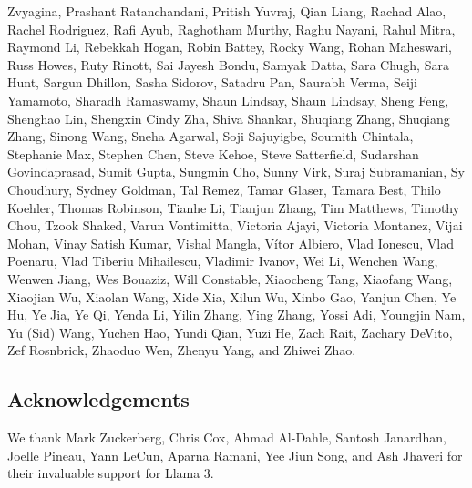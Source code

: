 Zvyagina, Prashant Ratanchandani, Pritish Yuvraj, Qian Liang, Rachad Alao, Rachel Rodriguez, Rafi Ayub, Raghotham Murthy, Raghu Nayani, Rahul Mitra, Raymond Li, Rebekkah Hogan, Robin Battey, Rocky Wang, Rohan Maheswari, Russ Howes, Ruty Rinott, Sai Jayesh Bondu, Samyak Datta, Sara Chugh, Sara Hunt, Sargun Dhillon, Sasha Sidorov, Satadru Pan, Saurabh Verma, Seiji Yamamoto, Sharadh Ramaswamy, Shaun Lindsay, Shaun Lindsay, Sheng Feng, Shenghao Lin, Shengxin Cindy Zha, Shiva Shankar, Shuqiang Zhang, Shuqiang Zhang, Sinong Wang, Sneha Agarwal, Soji Sajuyigbe, Soumith Chintala, Stephanie Max, Stephen Chen, Steve Kehoe, Steve Satterfield, Sudarshan Govindaprasad, Sumit Gupta, Sungmin Cho, Sunny Virk, Suraj Subramanian, Sy Choudhury, Sydney Goldman, Tal Remez, Tamar Glaser, Tamara Best, Thilo Koehler, Thomas Robinson, Tianhe Li, Tianjun Zhang, Tim Matthews, Timothy Chou, Tzook Shaked, Varun Vontimitta, Victoria Ajayi, Victoria Montanez, Vijai Mohan, Vinay Satish Kumar, Vishal Mangla, Vítor Albiero, Vlad Ionescu, Vlad Poenaru, Vlad Tiberiu Mihailescu, Vladimir Ivanov, Wei Li, Wenchen Wang, Wenwen Jiang, Wes Bouaziz, Will Constable, Xiaocheng Tang, Xiaofang Wang, Xiaojian Wu, Xiaolan Wang, Xide Xia, Xilun Wu, Xinbo Gao, Yanjun Chen, Ye Hu, Ye Jia, Ye Qi, Yenda Li, Yilin Zhang, Ying Zhang, Yossi Adi, Youngjin Nam, Yu (Sid) Wang, Yuchen Hao, Yundi Qian, Yuzi He, Zach Rait, Zachary DeVito, Zef Rosnbrick, Zhaoduo Wen, Zhenyu Yang, and Zhiwei Zhao.

\subsection*{Acknowledgements}
We thank Mark Zuckerberg, Chris Cox, Ahmad Al-Dahle, Santosh Janardhan, Joelle Pineau, Yann LeCun, Aparna Ramani, Yee Jiun Song, and Ash Jhaveri for their invaluable support for Llama 3.

